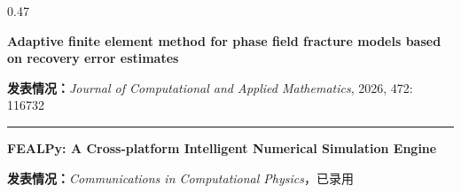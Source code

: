 \documentclass[notheorems]{beamer}
\begin{document}
\begin{frame}
\begin{columns}[T, totalwidth=\linewidth]
\begin{column}{0.47\linewidth}
\begin{tcolorbox}
					{\fontsize{7.5}{12}\selectfont\sffamily\bfseries
						Adaptive finite element method for phase field
						fracture models based on recovery error estimates\par}
					
					{\fontsize{7}{10.5}\selectfont\sffamily
						\textbf{发表情况：}\textit{Journal of Computational and Applied Mathematics}, 2026, 472: 116732}
					
					\vspace{-4pt}
					{\color{structure.fg!25}\rule{\linewidth}{0.4pt}}
					\vspace{-8pt}
					
					{\fontsize{7.5}{12}\selectfont\sffamily\bfseries
						FEALPy: A Cross-platform Intelligent Numerical
						Simulation Engine\par}
					
					{\fontsize{7}{10.5}\selectfont\sffamily
						\textbf{发表情况：}\textit{Communications in Computational Physics}，已录用}
					
				\end{tcolorbox}
			\end{column}
			
		\end{columns}
		
	\end{frame}
	
	
\end{document}
